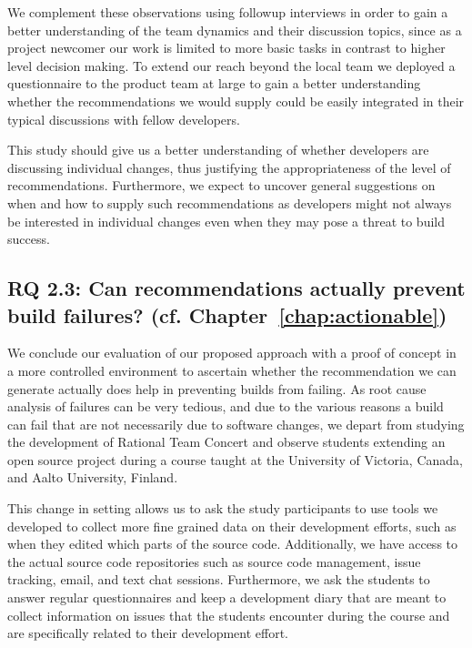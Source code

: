 We complement these observations using followup interviews in order to gain a better understanding of the team dynamics and their discussion topics, since as a project newcomer our work is limited to more basic tasks in contrast to higher level decision making.
To extend our reach beyond the local team we deployed a questionnaire to the product team at large to gain a better understanding whether the recommendations we would supply could be easily integrated in their typical discussions with fellow developers.

This study should give us a better understanding of whether developers are discussing individual changes, thus justifying the appropriateness of the level of recommendations.
Furthermore, we expect to uncover general suggestions on when and how to supply such recommendations as developers might not always be interested in individual changes even when they may pose a threat to build success.

\subsection{%
  RQ 2.3: Can recommendations actually prevent build failures? (cf. Chapter~\ref{chap:actionable})}
We conclude our evaluation of our proposed approach with  a proof of concept in a more controlled environment to ascertain whether the recommendation we can generate actually does help in preventing builds from failing.
As root cause analysis of failures can be very tedious, and due to the various reasons a build can fail that are not necessarily due to software changes, we depart from studying the development of Rational Team Concert and observe students extending an open source project during a course taught at the University of Victoria, Canada, and Aalto University, Finland.

This change in setting allows us to ask the study participants to use tools we developed to collect more fine grained data on their development efforts, such as when they edited which parts of the source code.
Additionally, we have access to the actual source code repositories such as source code management, issue tracking, email, and text chat sessions.
Furthermore, we ask the students to answer regular questionnaires and keep a development diary that are meant to collect information on issues that the students encounter during the course and are specifically related to their development effort.

